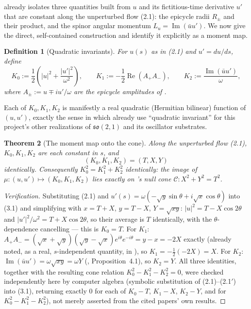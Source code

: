\documentclass[11pt]{amsart}
\newtheorem{theorem}{Theorem}[section]
\newtheorem{definition}[theorem]{Definition}
\theoremstyle{remark}
\begin{document}
\cite{Ebert2026Epicycle} already isolates three quantities built from $u$ and its fictitious-time derivative $u'$ that are constant along the unperturbed flow (2.1): the epicycle radii $R_\pm$ and their product, and the spinor angular momentum $L_u=\operatorname{Im}(\bar uu')$. We now give the direct, self-contained construction and identify it explicitly as a moment map.

\begin{definition}[Quadratic invariants]\label{def:moment}
For $u(s)$ as in (2.1) and $u'=du/ds$, define
\begin{equation}
K_0:=\frac12\left(|u|^2+\frac{|u'|^2}{\omega^2}\right),\qquad K_1:=-\frac12\operatorname{Re}(A_+A_-),\qquad K_2:=\frac{\operatorname{Im}(\bar uu')}{\omega}, \tag{3.1}
\end{equation}
where $A_\pm:=u\mp iu'/\omega$ are the epicycle amplitudes of \cite{Ebert2026Epicycle}.
\end{definition}

Each of $K_0,K_1,K_2$ is manifestly a real quadratic (Hermitian bilinear) function of $(u,u')$, exactly the sense in which \cite{Ebert2026Table,Ebert2026EigenCoord,Ebert2026Quantum} already use ``quadratic invariant'' for this project's other realizations of $\mathfrak{so}(2,1)$ and its oscillator substrates.

\begin{theorem}[The moment map onto the cone]\label{thm:momentmap}
Along the unperturbed flow (2.1), $K_0,K_1,K_2$ are each constant in $s$, and
\begin{equation}
(K_0,K_1,K_2)=(T,X,Y) \tag{3.2}
\end{equation}
identically. Consequently $K_0^2=K_1^2+K_2^2$ identically: the image of $\mu:(u,u')\mapsto(K_0,K_1,K_2)$ lies exactly on \cite{Ebert2026Cone}'s null cone $\mathcal C:X^2+Y^2=T^2$.
\end{theorem}

\begin{proof}[Verification]
Substituting (2.1) and $u'(s)=\omega(-\sqrt y\sin\theta+i\sqrt x\cos\theta)$ into (3.1) and simplifying with $x=T+X$, $y=T-X$, $Y=\sqrt{xy}$: $|u|^2=T-X\cos2\theta$ and $|u'|^2/\omega^2=T+X\cos2\theta$, so their average is $T$ identically, with the $\theta$-dependence cancelling --- this is $K_0=T$. For $K_1$: $A_+A_-=(\sqrt x+\sqrt y)(\sqrt y-\sqrt x)e^{i\theta}e^{-i\theta}=y-x=-2X$ exactly (already noted, as a real, $s$-independent quantity, in \cite{Ebert2026Epicycle}), so $K_1=-\tfrac12(-2X)=X$. For $K_2$: $\operatorname{Im}(\bar uu')=\omega\sqrt{xy}=\omega Y$ (\cite{Ebert2026Epicycle}, Proposition~4.1), so $K_2=Y$. All three identities, together with the resulting cone relation $K_0^2-K_1^2-K_2^2=0$, were checked independently here by computer algebra (symbolic substitution of (2.1)--(2.1$'$) into (3.1), returning exactly $0$ for each of $K_0-T$, $K_1-X$, $K_2-Y$, and for $K_0^2-K_1^2-K_2^2$), not merely asserted from the cited papers' own results.
\end{proof}
\end{document}

